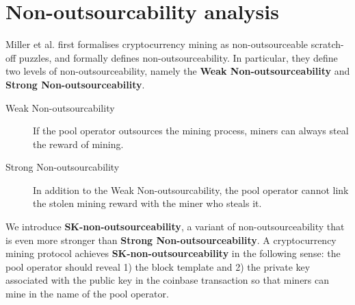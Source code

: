\section{Non-outsourcability analysis}



Miller et al. \cite{miller2015nonoutsourceable} first formalises cryptocurrency mining as non-outsourceable scratch-off puzzles, and formally defines non-outsourceability.
In particular, they define two levels of non-outsourceability, namely the \textbf{Weak Non-outsourceability} and \textbf{Strong Non-outsourceability}.

\begin{description}
    \item[Weak Non-outsourcability] If the pool operator outsources the mining process, miners can always steal the reward of mining.
    \item[Strong Non-outsourcability] In addition to the Weak Non-outsourcability, the pool operator cannot link the stolen mining reward with the miner who steals it.
\end{description}

We introduce \textbf{SK-non-outsourceability}, a variant of non-outsourceability that is even more stronger than \textbf{Strong Non-outsourceability}.
A cryptocurrency mining protocol achieves \textbf{SK-non-outsourceability} in the following sense: the pool operator should reveal 1) the block template and 2) the private key associated with the public key in the coinbase transaction so that miners can mine in the name of the pool operator.

